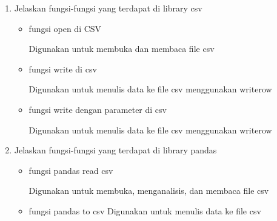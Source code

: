 \begin{enumerate}
\item Jelaskan fungsi-fungsi yang terdapat di library csv
\begin{itemize}

	\item fungsi open di CSV
	
	Digunakan untuk membuka dan membaca file csv
	

	\item fungsi write di csv
	
	Digunakan untuk menulis data ke file csv menggunakan writerow
	
	
	\item fungsi write dengan parameter di csv
	
	Digunakan untuk menulis data ke file csv menggunakan writerow
	

\end{itemize}

\item Jelaskan fungsi-fungsi yang terdapat di library pandas
\begin{itemize}

	\item fungsi pandas read csv
	
	Digunakan untuk membuka, menganalisis, dan membaca file csv
	
	
	\item fungsi pandas to csv
	Digunakan untuk menulis data ke file csv
	

\end{itemize}
\end{enumerate}


